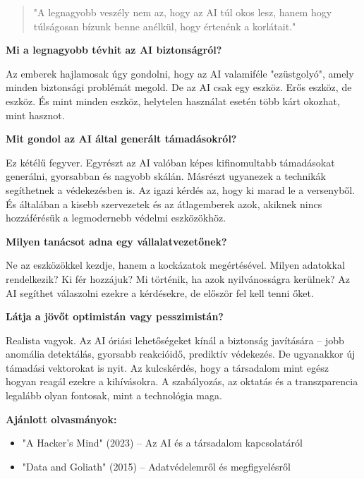 \documentclass{../templates/magazine}
\begin{document}
\vspace{0.5cm}

\begin{quote}
"A legnagyobb veszély nem az, hogy az AI túl okos lesz, hanem hogy túlságosan bízunk benne anélkül, hogy értenénk a korlátait."
\end{quote}

\textbf{Mi a legnagyobb tévhit az AI biztonságról?}

Az emberek hajlamosak úgy gondolni, hogy az AI valamiféle "ezüstgolyó", amely minden biztonsági problémát megold. De az AI csak egy eszköz. Erős eszköz, de eszköz. És mint minden eszköz, helytelen használat esetén több kárt okozhat, mint hasznot.

\vspace{0.3cm}

\textbf{Mit gondol az AI által generált támadásokról?}

Ez kétélű fegyver. Egyrészt az AI valóban képes kifinomultabb támadásokat generálni, gyorsabban és nagyobb skálán. Másrészt ugyanezek a technikák segíthetnek a védekezésben is. Az igazi kérdés az, hogy ki marad le a versenyből. És általában a kisebb szervezetek és az átlagemberek azok, akiknek nincs hozzáférésük a legmodernebb védelmi eszközökhöz.

\vspace{0.3cm}

\textbf{Milyen tanácsot adna egy vállalatvezetőnek?}

Ne az eszközökkel kezdje, hanem a kockázatok megértésével. Milyen adatokkal rendelkezik? Ki fér hozzájuk? Mi történik, ha azok nyilvánosságra kerülnek? Az AI segíthet válaszolni ezekre a kérdésekre, de először fel kell tenni őket.

\vspace{0.3cm}

\textbf{Látja a jövőt optimistán vagy pesszimistán?}

Realista vagyok. Az AI óriási lehetőségeket kínál a biztonság javítására -- jobb anomália detektálás, gyorsabb reakcióidő, prediktív védekezés. De ugyanakkor új támadási vektorokat is nyit. Az kulcskérdés, hogy a társadalom mint egész hogyan reagál ezekre a kihívásokra. A szabályozás, az oktatás és a transzparencia legalább olyan fontosak, mint a technológia maga.

\vspace{0.5cm}

\begin{infobox}
\textbf{Ajánlott olvasmányok:}
\begin{itemize}
    \item "A Hacker's Mind" (2023) -- Az AI és a társadalom kapcsolatáról
    \item "Data and Goliath" (2015) -- Adatvédelemről és megfigyelésről
\end{itemize}
\end{infobox}
\end{document}
